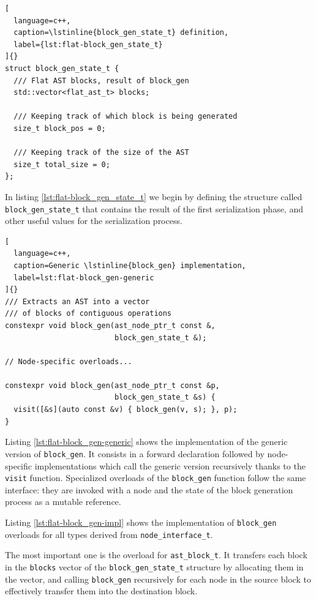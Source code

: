 \documentclass[../main]{subfiles}
\begin{document}
\clearpage%

\begin{lstlisting}[
  language=c++,
  caption=\lstinline{block_gen_state_t} definition,
  label={lst:flat-block_gen_state_t}
]{}
struct block_gen_state_t {
  /// Flat AST blocks, result of block_gen
  std::vector<flat_ast_t> blocks;

  /// Keeping track of which block is being generated
  size_t block_pos = 0;

  /// Keeping track of the size of the AST
  size_t total_size = 0;
};
\end{lstlisting}

In listing \ref{lst:flat-block_gen_state_t} we begin by defining the structure
called \lstinline{block_gen_state_t} that contains the result of the first
serialization phase, and other useful values for the serialization process.

\begin{lstlisting}[
  language=c++,
  caption=Generic \lstinline{block_gen} implementation,
  label=lst:flat-block_gen-generic
]{}
/// Extracts an AST into a vector
/// of blocks of contiguous operations
constexpr void block_gen(ast_node_ptr_t const &,
                         block_gen_state_t &);

// Node-specific overloads...

constexpr void block_gen(ast_node_ptr_t const &p,
                         block_gen_state_t &s) {
  visit([&s](auto const &v) { block_gen(v, s); }, p);
}
\end{lstlisting}

Listing \ref{lst:flat-block_gen-generic} shows the implementation of the generic
version of \lstinline{block_gen}. It consists in a forward declaration
followed by node-specific implementations which call the generic version
recursively thanks to the  \lstinline{visit} function.
Specialized overloads of the \lstinline{block_gen} function follow the same
interface: they are invoked with a node and the state of the block generation
process as a mutable reference.

Listing \ref{lst:flat-block_gen-impl} shows the implementation of
\lstinline{block_gen} overloads for all types derived from
\lstinline{node_interface_t}.

The most important one is the overload for \lstinline{ast_block_t}.
It transfers each block in the \lstinline{blocks} vector
of the \lstinline{block_gen_state_t} structure by allocating them in the vector,
and calling \lstinline{block_gen} recursively for each node in the source block
to effectively transfer them into the destination block.
\end{document}
